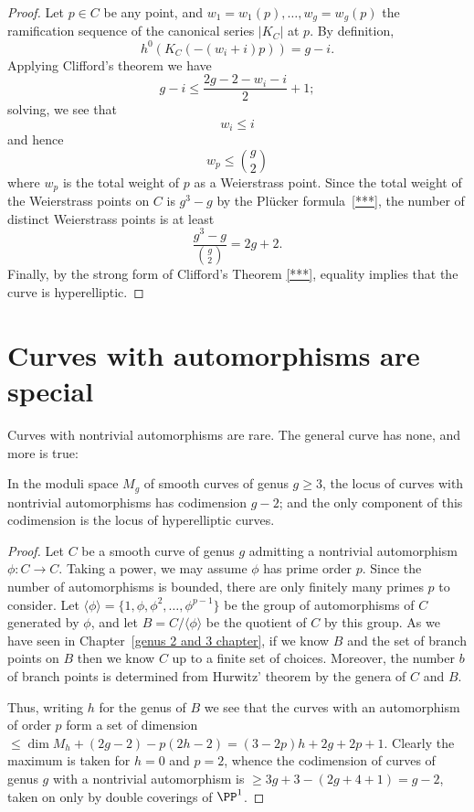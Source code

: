 \begin{proof}
Let $p \in C$ be any point, and $w_1=w_1(p),\dots,w_g = w_g(p)$ the ramification sequence of the canonical series $|K_C|$ at $p$. By definition, 
$$
h^0(K_C(-(w_i+i)p)) = g - i.
$$
Applying Clifford's theorem we have
$$
g-i \leq \frac{2g - 2 - w_i - i}{2} + 1;
$$
solving, we see that
$$
w_i \leq i
$$
and hence
$$
w_p \leq \binom{g}{2}
$$
where $w_p$ is the total weight of $p$ as a Weierstrass point. Since the total weight of the Weierstrass points on $C$ is $g^3-g$ by the Pl\"ucker formula~\ref{***}, the number of distinct Weierstrass points is at least
$$
\frac{g^3-g}{\binom{g}{2}} = 2g+2.
$$
Finally, by the strong form of Clifford's Theorem \ref{***}, equality implies that the curve is hyperelliptic.
\end{proof}

\section{Curves with automorphisms are special}\label{curves with automorphisms}

Curves with nontrivial automorphisms are rare. The general curve has none, and more is true:

\begin{lemma}
In the moduli space $M_g$ of smooth curves of genus $g \geq 3$, the locus of curves with nontrivial automorphisms has codimension $g-2$; and the only component of this codimension is the locus
of hyperelliptic curves.
\end{lemma}

\begin{proof} 
Let $C$ be a smooth curve of genus $g$ admitting a nontrivial automorphism $\phi : C \to C$. Taking a power, we may assume $\phi$ has prime order $p$. Since the number of automorphisms is bounded,
there are only finitely many primes $p$ to consider. Let $\langle \phi \rangle = \{1, \phi, \phi^2,\dots,\phi^{p-1} \}$ be the group of automorphisms of $C$ generated by $\phi$, and let $B = C/\langle \phi \rangle $ be the quotient of $C$ by this group. As we have seen in Chapter~\ref{genus 2 and 3 chapter}, if we know $B$ and the set
of branch points on $B$ then we know $C$ up to a finite set of choices.  Moreover, the number $b$ of 
branch points is determined from Hurwitz' theorem by the genera of $C$ and $B$. 

Thus,
writing $h$ for the genus of $B$ we see that the curves with an automorphism of order $p$
form a set of dimension $\leq \dim M_{h}+ (2g-2)-p(2h-2) = (3-2p)h+2g+2p+1$. 
Clearly the maximum is taken for $h=0$ and $p=2$, whence the codimension
of curves of genus $g$ with a nontrivial  automorphism is $\geq 3g+3 - (2g+4+1) = g-2$,
taken on only by double coverings of $\PP^{1}$.
\end{proof}



